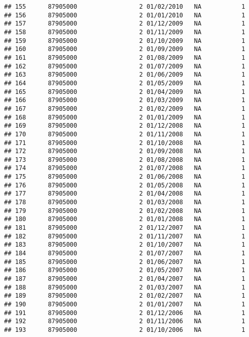 \documentclass[
]{article}
\begin{document}
\begin{verbatim}
## 155      87905000                 2 01/02/2010   NA           1
## 156      87905000                 2 01/01/2010   NA           1
## 157      87905000                 2 01/12/2009   NA           1
## 158      87905000                 2 01/11/2009   NA           1
## 159      87905000                 2 01/10/2009   NA           1
## 160      87905000                 2 01/09/2009   NA           1
## 161      87905000                 2 01/08/2009   NA           1
## 162      87905000                 2 01/07/2009   NA           1
## 163      87905000                 2 01/06/2009   NA           1
## 164      87905000                 2 01/05/2009   NA           1
## 165      87905000                 2 01/04/2009   NA           1
## 166      87905000                 2 01/03/2009   NA           1
## 167      87905000                 2 01/02/2009   NA           1
## 168      87905000                 2 01/01/2009   NA           1
## 169      87905000                 2 01/12/2008   NA           1
## 170      87905000                 2 01/11/2008   NA           1
## 171      87905000                 2 01/10/2008   NA           1
## 172      87905000                 2 01/09/2008   NA           1
## 173      87905000                 2 01/08/2008   NA           1
## 174      87905000                 2 01/07/2008   NA           1
## 175      87905000                 2 01/06/2008   NA           1
## 176      87905000                 2 01/05/2008   NA           1
## 177      87905000                 2 01/04/2008   NA           1
## 178      87905000                 2 01/03/2008   NA           1
## 179      87905000                 2 01/02/2008   NA           1
## 180      87905000                 2 01/01/2008   NA           1
## 181      87905000                 2 01/12/2007   NA           1
## 182      87905000                 2 01/11/2007   NA           1
## 183      87905000                 2 01/10/2007   NA           1
## 184      87905000                 2 01/07/2007   NA           1
## 185      87905000                 2 01/06/2007   NA           1
## 186      87905000                 2 01/05/2007   NA           1
## 187      87905000                 2 01/04/2007   NA           1
## 188      87905000                 2 01/03/2007   NA           1
## 189      87905000                 2 01/02/2007   NA           1
## 190      87905000                 2 01/01/2007   NA           1
## 191      87905000                 2 01/12/2006   NA           1
## 192      87905000                 2 01/11/2006   NA           1
## 193      87905000                 2 01/10/2006   NA           1

\end{verbatim}
\end{document}
